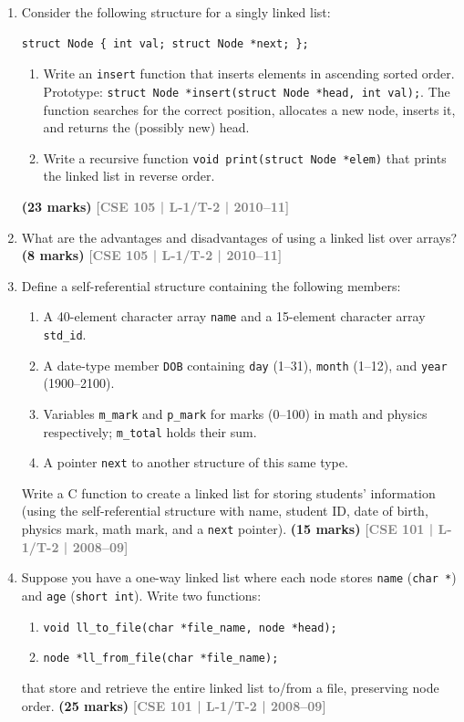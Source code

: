 \documentclass[12pt,a3paper]{article}
\newcommand{\yr}[1]{\hfill\textcolor{gray}{\small\textbf{[#1]}}}
\newcommand{\mk}[1]{\textcolor{orange!70!black}{\small\textbf{(#1 marks)}}}
\begin{document}
\begin{enumerate}
\item Consider the following structure for a singly linked list:
\begin{lstlisting}
struct Node { int val; struct Node *next; };
\end{lstlisting}
\begin{enumerate}
  \item Write an \texttt{insert} function that inserts elements in ascending sorted order. Prototype: \texttt{struct Node *insert(struct Node *head, int val);}. The function searches for the correct position, allocates a new node, inserts it, and returns the (possibly new) head.
  \item Write a recursive function \texttt{void print(struct Node *elem)} that prints the linked list in reverse order.
\end{enumerate}
\mk{23} \yr{CSE 105 | L-1/T-2 | 2010--11}

\item What are the advantages and disadvantages of using a linked list over arrays?
\mk{8} \yr{CSE 105 | L-1/T-2 | 2010--11}

\item Define a self-referential structure containing the following members:
\begin{enumerate}
  \item A 40-element character array \texttt{name} and a 15-element character array \texttt{std\_id}.
  \item A date-type member \texttt{DOB} containing \texttt{day} (1--31), \texttt{month} (1--12), and \texttt{year} (1900--2100).
  \item Variables \texttt{m\_mark} and \texttt{p\_mark} for marks (0--100) in math and physics respectively; \texttt{m\_total} holds their sum.
  \item A pointer \texttt{next} to another structure of this same type.
\end{enumerate}

Write a C function to create a linked list for storing students' information (using the self-referential structure with name, student ID, date of birth, physics mark, math mark, and a \texttt{next} pointer).
\mk{15} \yr{CSE 101 | L-1/T-2 | 2008--09}

\item Suppose you have a one-way linked list where each node stores \texttt{name} (\texttt{char *}) and \texttt{age} (\texttt{short int}). Write two functions:
\begin{enumerate}
  \item \texttt{void ll\_to\_file(char *file\_name, node *head);}
  \item \texttt{node *ll\_from\_file(char *file\_name);}
\end{enumerate}
that store and retrieve the entire linked list to/from a file, preserving node order.
\mk{25} \yr{CSE 101 | L-1/T-2 | 2008--09}


\end{enumerate}
\end{document}
